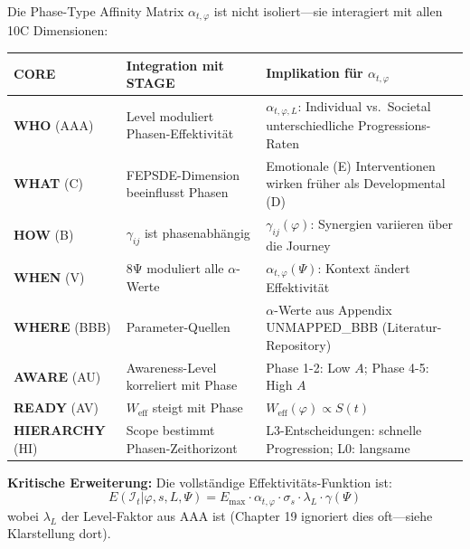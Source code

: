 \begin{tcolorbox}[colback=purple!5!white, colframe=purple!75!black,
    title=\textbf{10C Integration: STAGE (AW) und die anderen COREs}]

Die Phase-Type Affinity Matrix $\alpha_{t,\varphi}$ ist nicht isoliert---sie interagiert mit allen 10C Dimensionen:

\begin{center}
\renewcommand{\arraystretch}{1.2}
\footnotesize
\begin{tabular}{@{}llp{6cm}@{}}
\toprule
\textbf{CORE} & \textbf{Integration mit STAGE} & \textbf{Implikation für $\alpha_{t,\varphi}$} \\
\midrule
\textbf{WHO} (AAA) & Level moduliert Phasen-Effektivität & $\alpha_{t,\varphi,L}$: Individual vs.\ Societal unterschiedliche Progressions-Raten \\
\textbf{WHAT} (C) & FEPSDE-Dimension beeinflusst Phasen & Emotionale (E) Interventionen wirken früher als Developmental (D) \\
\textbf{HOW} (B) & $\gamma_{ij}$ ist phasenabhängig & $\gamma_{ij}(\varphi)$: Synergien variieren über die Journey \\
\textbf{WHEN} (V) & 8Ψ moduliert alle $\alpha$-Werte & $\alpha_{t,\varphi}(\Psi)$: Kontext ändert Effektivität \\
\textbf{WHERE} (BBB) & Parameter-Quellen & $\alpha$-Werte aus Appendix UNMAPPED_BBB (Literatur-Repository) \\
\textbf{AWARE} (AU) & Awareness-Level korreliert mit Phase & Phase 1-2: Low $A$; Phase 4-5: High $A$ \\
\textbf{READY} (AV) & $W_{\text{eff}}$ steigt mit Phase & $W_{\text{eff}}(\varphi) \propto S(t)$ \\
\textbf{HIERARCHY} (HI) & Scope bestimmt Phasen-Zeithorizont & L3-Entscheidungen: schnelle Progression; L0: langsame \\
\bottomrule
\end{tabular}
\end{center}

\textbf{Kritische Erweiterung:} Die vollständige Effektivitäts-Funktion ist:
\begin{equation}
\boxed{E(\mathcal{I}_t | \varphi, s, L, \Psi) = E_{\max} \cdot \alpha_{t,\varphi} \cdot \sigma_s \cdot \lambda_L \cdot \gamma(\Psi)}
\end{equation}
wobei $\lambda_L$ der Level-Faktor aus AAA ist (Chapter 19 ignoriert dies oft---siehe Klarstellung dort).

\end{tcolorbox}

